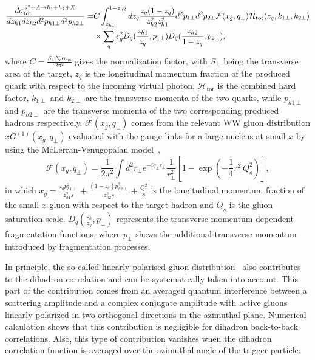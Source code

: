 \begin{eqnarray}\label{eqn:xspairCGC}
\frac{d\sigma^{\gamma^{*}+A\rightarrow h_{1}+h_{2}+X}_{\textrm{tot}}}{dz_{h1}dz_{h2}d^{2}p_{h1\perp}d^{2}p_{h2\perp}} = & C\int^{1-z_{h2}}_{z_{h1}} dz_{q}
\frac{z_{q}(1-z_{q})}{z^{2}_{h2}z^{2}_{h1}}
d^{2}p_{1\perp}d^{2}p_{2\perp}\mathcal{F}(x_{g},q_{\perp})
\mathcal{H}_{\textrm{tot}}(z_{q},k_{1\perp},k_{2\perp}) \\ \nonumber
& \times \sum_{q}e^{2}_{q}D_{q}(\frac{z_{h1}}{z_{q}},p_{1\perp})
D_{\bar{q}}(\frac{z_{h2}}{1-z_{q}},p_{2\perp}),
\end{eqnarray}  
where $C=\frac{S_{\perp}N_{c}\alpha_{em}}{2\pi^{2}}$ gives the normalization
factor, with $S_{\perp}$ being the transverse area of the target, $z_{q}$ is the
longitudinal momentum fraction of the produced quark with respect to the incoming
virtual photon, $\mathcal{H}_{\textrm{tot}}$ is the combined hard factor,
$k_{1\perp}$ and $k_{2\perp}$ are the transverse momenta of the two quarks, while
$p_{h1\perp}$ and $p_{h2\perp}$ are the transverse momenta of the two corresponding
produced hadrons respectively. $\mathcal{F}(x_{g},q_{\perp})$ comes from the
relevant WW gluon distribution $xG^{(1)}(x_g,q_\perp)$ evaluated with the gauge
links for a large nucleus at small $x$ by using the McLerran-Venugopalan
model~\cite{McLerran:1993ni},
\begin{equation} 
\mathcal{F}(x_{g}, q_{\perp}) =
\frac{1}{2\pi^{2}} \int d^{2}r_{\perp} e^{-iq_{\perp}r_{\perp}}
\frac{1}{r^{2}_{\perp}}[1-\exp(-\frac{1}{4}r^{2}_{\perp}Q^{2}_{s})],
\end{equation}
in which $x_{g}=\frac{z_{q}p_{h1\perp}^2}{z_{h1}^2s}+\frac{(1-z_{q})p_{h2\perp}^2}{z_{h2}^2s}+\frac{Q^2}{s}$ 
is the longitudinal momentum fraction of the small-$x$ gluon with respect to the target hadron and 
$Q_{s}$ is the gluon saturation scale. $D_{q}(\frac{z_{h}}{z_{q}},p_{\perp})$ represents the transverse 
momentum dependent fragmentation functions, where $p_{\perp}$ shows the additional transverse
momentum introduced by fragmentation processes.

In principle, the so-called linearly polarised gluon
distribution~\cite{Metz:2011wb,Dominguez:2011br} also contributes to the dihadron
correlation and can be systematically taken into account. This part of the
contribution comes from an averaged quantum interference between a scattering
amplitude and a complex conjugate amplitude with active gluons linearly
polarized in two orthogonal directions in the azimuthal plane. Numerical
calculation shows that this contribution is negligible for dihadron back-to-back
correlations. Also, this type of contribution vanishes when the dihadron correlation function 
is averaged over the azimuthal angle of the trigger particle. 


